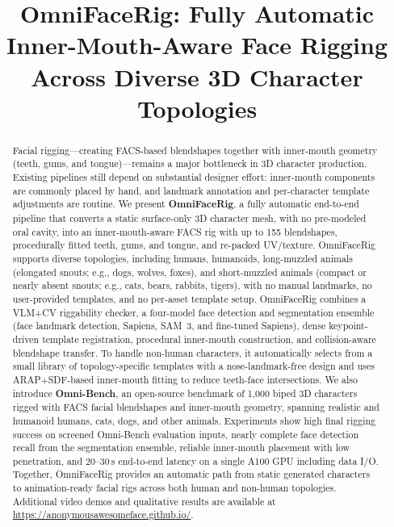 \documentclass[acmtog,anonymous,review]{acmart}
\begin{document}
\title{OmniFaceRig: Fully Automatic Inner-Mouth-Aware Face Rigging Across Diverse 3D Character Topologies}


\begin{abstract}
Facial rigging---creating FACS-based blendshapes together with inner-mouth geometry (teeth, gums, and tongue)---remains a major bottleneck in 3D character production. Existing pipelines still depend on substantial designer effort: inner-mouth components are commonly placed by hand, and landmark annotation and per-character template adjustments are routine. We present \textbf{OmniFaceRig}, a fully automatic end-to-end pipeline that converts a static surface-only 3D character mesh, with no pre-modeled oral cavity, into an inner-mouth-aware FACS rig with up to 155 blendshapes, procedurally fitted teeth, gums, and tongue, and re-packed UV/texture. OmniFaceRig supports diverse topologies, including humans, humanoids, long-muzzled animals (elongated snouts; e.g., dogs, wolves, foxes), and short-muzzled animals (compact or nearly absent snouts; e.g., cats, bears, rabbits, tigers), with no manual landmarks, no user-provided templates, and no per-asset template setup. OmniFaceRig combines a VLM+CV riggability checker, a four-model face detection and segmentation ensemble (face landmark detection, Sapiens, SAM~3, and fine-tuned Sapiens), dense keypoint-driven template registration, procedural inner-mouth construction, and collision-aware blendshape transfer. To handle non-human characters, it automatically selects from a small library of topology-specific templates with a nose-landmark-free design and uses ARAP+SDF-based inner-mouth fitting to reduce teeth-face intersections. We also introduce \textbf{Omni-Bench}, an open-source benchmark of 1,000 biped 3D characters rigged with FACS facial blendshapes and inner-mouth geometry, spanning realistic and humanoid humans, cats, dogs, and other animals. Experiments show high final rigging success on screened Omni-Bench evaluation inputs, nearly complete face detection recall from the segmentation ensemble, reliable inner-mouth placement with low penetration, and 20--30\,s end-to-end latency on a single A100 GPU including data I/O. Together, OmniFaceRig provides an automatic path from static generated characters to animation-ready facial rigs across both human and non-human topologies. Additional video demos and qualitative results are available at \textcolor{blue}{\url{https://anonymousawesomeface.github.io/}}.
\end{abstract}
\end{document}
